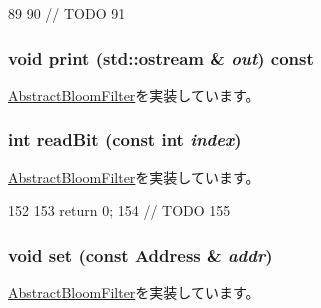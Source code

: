 \begin{DoxyCode}
89 {
90     // TODO
91 }
\end{DoxyCode}
\hypertarget{classMultiGrainBloomFilter_ac55fe386a101fbae38c716067c9966a0}{
\subsubsection[{print}]{\setlength{\rightskip}{0pt plus 5cm}void print (std::ostream \& {\em out}) const}}
\label{classMultiGrainBloomFilter_ac55fe386a101fbae38c716067c9966a0}


\hyperlink{classAbstractBloomFilter_a3ea5f7af5db62cc24f4e40df9ea5c971}{AbstractBloomFilter}を実装しています。\hypertarget{classMultiGrainBloomFilter_a6f8a98d0f38a8d122d4cbf87323484eb}{
\subsubsection[{readBit}]{\setlength{\rightskip}{0pt plus 5cm}int readBit (const int {\em index})}}
\label{classMultiGrainBloomFilter_a6f8a98d0f38a8d122d4cbf87323484eb}


\hyperlink{classAbstractBloomFilter_a6c0e9a098f0f210aa42eb2f1553804eb}{AbstractBloomFilter}を実装しています。


\begin{DoxyCode}
152 {
153     return 0;
154     // TODO
155 }
\end{DoxyCode}
\hypertarget{classMultiGrainBloomFilter_a2b666fae2a5c2b98bc5cba8e1333bcc9}{
\subsubsection[{set}]{\setlength{\rightskip}{0pt plus 5cm}void set (const {\bf Address} \& {\em addr})}}
\label{classMultiGrainBloomFilter_a2b666fae2a5c2b98bc5cba8e1333bcc9}


\hyperlink{classAbstractBloomFilter_a54e1262ae5f60efeb8714d0556b3c32e}{AbstractBloomFilter}を実装しています。



